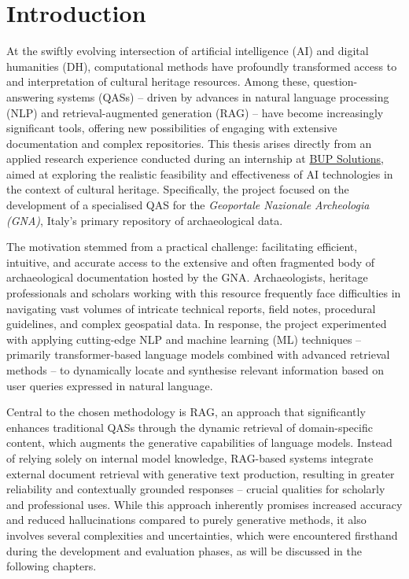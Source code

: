 \chapter{Introduction}
\label{chap:introduction}
\begin{spacing}{1.5}  %
At the swiftly evolving intersection of artificial intelligence (AI) and digital humanities (DH), computational methods have profoundly transformed access to and interpretation of cultural heritage resources. Among these, question-answering systems (QASs) -- driven by advances in natural language processing (NLP) and retrieval-augmented generation (RAG) -- have become increasingly significant tools, offering new possibilities of engaging with extensive documentation and complex repositories. This thesis arises directly from an applied research experience conducted during an internship at \href{https://www.bupsolutions.com/en/home_en/}{BUP Solutions}\nocite{bup_solutions_bup_nodate}, aimed at exploring the realistic feasibility and effectiveness of AI technologies in the context of cultural heritage. Specifically, the project focused on the development of a specialised QAS for the \textit{Geoportale Nazionale Archeologia (GNA)}, Italy’s primary repository of archaeological data.

The motivation stemmed from a practical challenge: facilitating efficient, intuitive, and accurate access to the extensive and often fragmented body of archaeological documentation hosted by the GNA. Archaeologists, heritage professionals and scholars working with this resource frequently face difficulties in navigating vast volumes of intricate technical reports, field notes, procedural guidelines, and complex geospatial data. In response, the project experimented with applying cutting-edge NLP and machine learning (ML) techniques -- primarily transformer-based language models combined with advanced retrieval methods -- to dynamically locate and synthesise relevant information based on user queries expressed in natural language.

Central to the chosen methodology is RAG, an approach that significantly enhances traditional QASs through the dynamic retrieval of domain-specific content, which augments the generative capabilities of language models. Instead of relying solely on internal model knowledge, RAG-based systems integrate external document retrieval with generative text production, resulting in greater reliability and contextually grounded responses -- crucial qualities for scholarly and professional uses. While this approach inherently promises increased accuracy and reduced hallucinations compared to purely generative methods, it also involves several complexities and uncertainties, which were encountered firsthand during the development and evaluation phases, as will be discussed in the following chapters.


\end{spacing}
